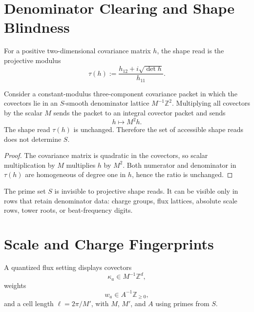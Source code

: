 \section{Denominator Clearing and Shape Blindness}
\label{sec:innovation-input-solenoid-denominator-clearing}

\begin{definition}
\label{def:innovation-input-solenoid-shape-read}
For a positive two-dimensional covariance matrix $h$, the shape read is the
projective modulus
$$
\tau(h):=\frac{h_{12}+i\sqrt{\det h}}{h_{11}}.
$$
\end{definition}

\begin{theorem}
\label{thm:innovation-input-solenoid-denominator-clearing}
Consider a constant-modulus three-component covariance packet in which
the covectors lie in an $S$-smooth denominator lattice
$M^{-1}\mathbb Z^2$. Multiplying all covectors by the scalar $M$ sends the
packet to an integral covector packet and sends
$$
h\longmapsto M^2h.
$$
The shape read $\tau(h)$ is unchanged. Therefore the set of accessible
shape reads does not determine $S$.
\end{theorem}

\begin{proof}
The covariance matrix is quadratic in the covectors, so scalar
multiplication by $M$ multiplies $h$ by $M^2$. Both numerator and
denominator in $\tau(h)$ are homogeneous of degree one in $h$, hence the
ratio is unchanged.
\end{proof}

\begin{principle}
\label{prin:innovation-input-solenoid-where-s-visible}
The prime set $S$ is invisible to projective shape reads. It can be visible
only in rows that retain denominator data: charge groups, flux lattices,
absolute scale rows, tower roots, or beat-frequency digits.
\end{principle}

\section{Scale and Charge Fingerprints}
\label{sec:innovation-input-solenoid-scale-charge-fingerprints}

\begin{definition}
\label{def:innovation-input-solenoid-quantized-flux-setting}
A quantized flux setting displays covectors
$$
\kappa_a\in M^{-1}\mathbb Z^d,
$$
weights
$$
w_a\in A^{-1}\mathbb Z_{\ge0},
$$
and a cell length $\ell=2\pi/M'$, with $M$, $M'$, and $A$ using primes
from $S$.
\end{definition}

